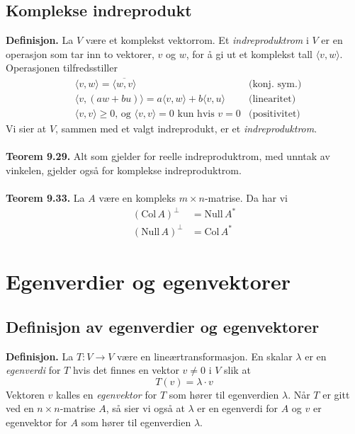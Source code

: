 \documentclass{article}
\begin{document}
\subsection{Komplekse indreprodukt}
\textbf{Definisjon.} La $V$ være et komplekst vektorrom. Et \textit{indreproduktrom} i $V$ er en operasjon som tar inn to vektorer, $v$ og $w$, for å gi ut et komplekst tall $\langle v, w \rangle$. Operasjonen tilfredsstiller
\begin{align*}
    &\langle v, w \rangle = \overline{ \langle w, v \rangle } &\text{(konj. sym.)} \\
    &\langle v, (aw + bu) \rangle = a \langle v, w \rangle + b \langle v, u \rangle &\text{(linearitet)} \\
    &\langle v, v \rangle \geq 0 \text{, og } \langle v, v \rangle = 0 \text{ kun hvis } v = 0 &\text{(positivitet)}
\end{align*}
Vi sier at $V$, sammen med et valgt indreprodukt, er et \textit{indreproduktrom}.
\\\\
\textbf{Teorem 9.29.} Alt som gjelder for reelle indreproduktrom, med unntak av vinkelen, gjelder også for komplekse indreproduktrom.
\\\\
\textbf{Teorem 9.33.} La $A$ være en kompleks $m \times n$-matrise. Da har vi
\begin{align*}
    (\text{Col}\,A)^\perp &= \text{Null}\,A^* \\
    (\text{Null}\,A)^\perp &= \text{Col}\,A^*
\end{align*}




\clearpage
\section{Egenverdier og egenvektorer}

\subsection{Definisjon av egenverdier og egenvektorer}
\textbf{Definisjon.} La $T: V \rightarrow V$ være en lineærtransformasjon. En skalar $\lambda$ er en \textit{egenverdi} for $T$ hvis det finnes en vektor $v \neq 0$ i $V$ slik at
\[ T(v) = \lambda \cdot v \]
Vektoren $v$ kalles en \textit{egenvektor} for $T$ som hører til egenverdien $\lambda$. Når $T$ er gitt ved en $n \times n$-matrise $A$, så sier vi også at $\lambda$ er en egenverdi for $A$ og $v$ er egenvektor for $A$ som hører til egenverdien $\lambda$.
\end{document}
